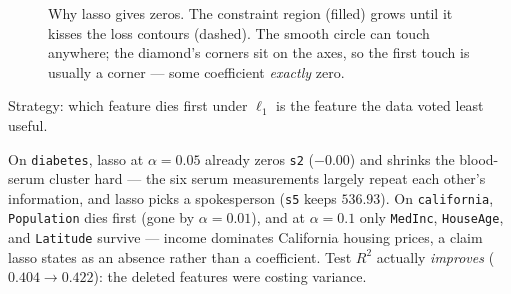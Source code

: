\begin{figure}[ht]\centering
{}
\caption{Why lasso gives zeros. The constraint region (filled) grows until
it kisses the loss contours (dashed). The smooth circle can touch anywhere;
the diamond's corners sit on the axes, so the first touch is usually a
corner --- some coefficient \emph{exactly} zero.}\label{fig:geometry}
\end{figure}





\begin{example}\label{ex:killorder}
Strategy: which feature dies first under $\ell_1$ is the feature the data
voted least useful.\par
\begin{solution}
On \texttt{diabetes}, lasso at $\alpha{=}0.05$ already zeros \texttt{s2}
($-0.00$) and shrinks the blood-serum cluster hard --- the six serum
measurements largely repeat each other's information, and lasso picks a
spokesperson (\texttt{s5} keeps $536.93$). On \texttt{california},
\texttt{Population} dies first (gone by $\alpha{=}0.01$), and at
$\alpha{=}0.1$ only \texttt{MedInc}, \texttt{HouseAge}, and
\texttt{Latitude} survive --- income dominates California housing prices,
a claim lasso states as an absence rather than a coefficient. Test $R^2$
actually \emph{improves} ($0.404 \to 0.422$): the deleted features were
costing variance.
\end{solution}
\end{example}

